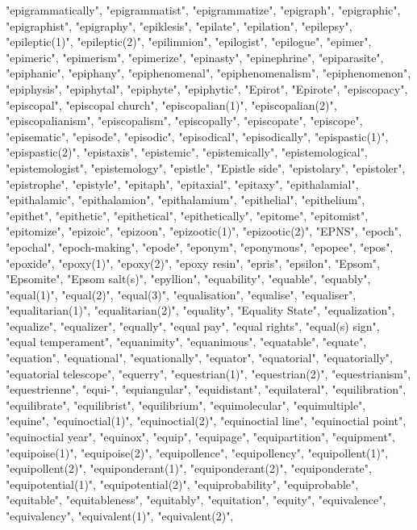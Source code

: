 "epigrammatically",
"epigrammatist",
"epigrammatize",
"epigraph",
"epigraphic",
"epigraphist",
"epigraphy",
"epiklesis",
"epilate",
"epilation",
"epilepsy",
"epileptic(1)",
"epileptic(2)",
"epilimnion",
"epilogist",
"epilogue",
"epimer",
"epimeric",
"epimerism",
"epimerize",
"epinasty",
"epinephrine",
"epiparasite",
"epiphanic",
"epiphany",
"epiphenomenal",
"epiphenomenalism",
"epiphenomenon",
"epiphysis",
"epiphytal",
"epiphyte",
"epiphytic",
"Epirot",
"Epirote",
"episcopacy",
"episcopal",
"episcopal church",
"episcopalian(1)",
"episcopalian(2)",
"episcopalianism",
"episcopalism",
"episcopally",
"episcopate",
"episcope",
"episematic",
"episode",
"episodic",
"episodical",
"episodically",
"epispastic(1)",
"epispastic(2)",
"epistaxis",
"epistemic",
"epistemically",
"epistemological",
"epistemologist",
"epistemology",
"epistle",
"Epistle side",
"epistolary",
"epistoler",
"epistrophe",
"epistyle",
"epitaph",
"epitaxial",
"epitaxy",
"epithalamial",
"epithalamic",
"epithalamion",
"epithalamium",
"epithelial",
"epithelium",
"epithet",
"epithetic",
"epithetical",
"epithetically",
"epitome",
"epitomist",
"epitomize",
"epizoic",
"epizoon",
"epizootic(1)",
"epizootic(2)",
"EPNS",
"epoch",
"epochal",
"epoch-making",
"epode",
"eponym",
"eponymous",
"epopee",
"epos",
"epoxide",
"epoxy(1)",
"epoxy(2)",
"epoxy resin",
"epris",
"epsilon",
"Epsom",
"Epsomite",
"Epsom salt(s)",
"epyllion",
"equability",
"equable",
"equably",
"equal(1)",
"equal(2)",
"equal(3)",
"equalisation",
"equalise",
"equaliser",
"equalitarian(1)",
"equalitarian(2)",
"equality",
"Equality State",
"equalization",
"equalize",
"equalizer",
"equally",
"equal pay",
"equal rights",
"equal(s) sign",
"equal temperament",
"equanimity",
"equanimous",
"equatable",
"equate",
"equation",
"equational",
"equationally",
"equator",
"equatorial",
"equatorially",
"equatorial telescope",
"equerry",
"equestrian(1)",
"equestrian(2)",
"equestrianism",
"equestrienne",
"equi-",
"equiangular",
"equidistant",
"equilateral",
"equilibration",
"equilibrate",
"equilibrist",
"equilibrium",
"equimolecular",
"equimultiple",
"equine",
"equinoctial(1)",
"equinoctial(2)",
"equinoctial line",
"equinoctial point",
"equinoctial year",
"equinox",
"equip",
"equipage",
"equipartition",
"equipment",
"equipoise(1)",
"equipoise(2)",
"equipollence",
"equipollency",
"equipollent(1)",
"equipollent(2)",
"equiponderant(1)",
"equiponderant(2)",
"equiponderate",
"equipotential(1)",
"equipotential(2)",
"equiprobability",
"equiprobable",
"equitable",
"equitableness",
"equitably",
"equitation",
"equity",
"equivalence",
"equivalency",
"equivalent(1)",
"equivalent(2)",
